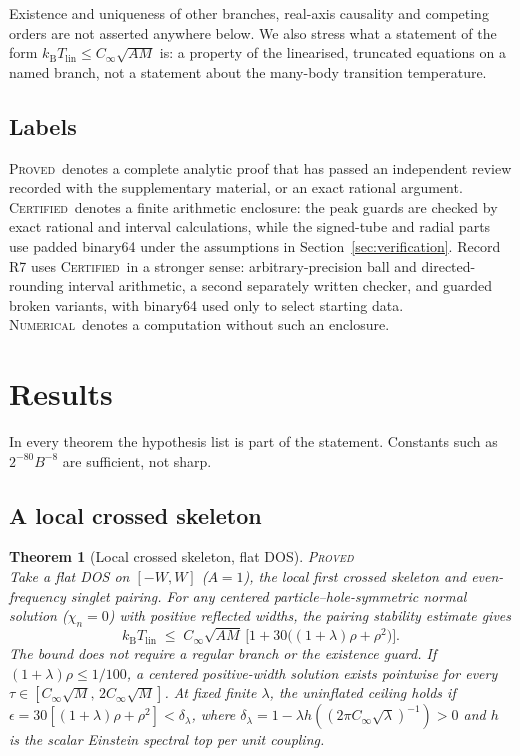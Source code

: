 \documentclass[11pt]{article}
\newcommand{\PROVED}{\upshape\mdseries\textsc{Proved}}
\newcommand{\CERT}{\upshape\mdseries\textsc{Certified}}
\newcommand{\NUM}{\upshape\mdseries\textsc{Numerical}}
\newcommand{\Cinf}{C_\infty}
\newcommand{\kB}{k_{\mathrm B}}
\newcommand{\Tlin}{T_{\mathrm{lin}}}
\newtheorem{theorem}{Theorem}[section]
\theoremstyle{definition}
\theoremstyle{remark}
\begin{document}
Existence and uniqueness of other branches, real-axis causality and competing orders are not asserted anywhere below. We also stress what a statement of the form $\kB\Tlin\le\Cinf\sqrt{AM}$ is: a property of the linearised, truncated equations on a named branch, not a statement about the many-body transition temperature.

\subsection{Labels}

\PROVED\ denotes a complete analytic proof that has passed an independent review recorded with the supplementary material, or an exact rational argument. \CERT\ denotes a finite arithmetic enclosure: the peak guards are checked by exact rational and interval calculations, while the signed-tube and radial parts use padded binary64 under the assumptions in Section~\ref{sec:verification}. Record R7 uses \CERT\ in a stronger sense: arbitrary-precision ball and directed-rounding interval arithmetic, a second separately written checker, and guarded broken variants, with binary64 used only to select starting data. \NUM\ denotes a computation without such an enclosure.

\section{Results}\label{sec:results}

In every theorem the hypothesis list is part of the statement. Constants such as $2^{-80}B^{-8}$ are sufficient, not sharp.

\subsection{A local crossed skeleton}

\begin{theorem}[Local crossed skeleton, flat DOS]\label{thm:V1}\hfill\PROVED\\
Take a flat DOS on $[-W,W]$ ($A=1$), the local first crossed skeleton and even-frequency singlet pairing. For any centered particle--hole-symmetric normal solution ($\chi_n=0$) with positive reflected widths, the pairing stability estimate gives
\begin{equation}\label{eq:V1}
\kB\Tlin\;\le\;\Cinf\sqrt{AM}\,\Big[1+30\big((1+\lambda)\rho+\rho^2\big)\Big].
\end{equation}
The bound does not require a regular branch or the existence guard. If $(1+\lambda)\rho\le1/100$, a centered positive-width solution exists pointwise for every $\tau\in[\Cinf\sqrt M,\,2\Cinf\sqrt M]$. At fixed finite $\lambda$, the uninflated ceiling holds if $\epsilon=30[(1+\lambda)\rho+\rho^2]<\delta_\lambda$, where $\delta_\lambda=1-\lambda h((2\pi\Cinf\sqrt\lambda)^{-1})>0$ and $h$ is the scalar Einstein spectral top per unit coupling.
\end{theorem}
\end{document}
